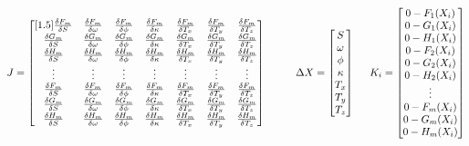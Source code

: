 \[
J = \begin{bmatrix}[1.5]
\ddx{F_m}{S} & \ddx{F_m}{\omega} & \ddx{F_m}{\phi} & \ddx{F_m}{\kappa} & \ddx{F_m}{T_x} & \ddx{F_m}{T_y} & \ddx{F_m}{T_z} \\
\ddx{G_m}{S} & \ddx{G_m}{\omega} & \ddx{G_m}{\phi} & \ddx{G_m}{\kappa} & \ddx{G_m}{T_x} & \ddx{G_m}{T_y} & \ddx{G_m}{T_z} \\
\ddx{H_m}{S} & \ddx{H_m}{\omega} & \ddx{H_m}{\phi} & \ddx{H_m}{\kappa} & \ddx{H_m}{T_x} & \ddx{H_m}{T_y} & \ddx{H_m}{T_z} \\
\vdots & \vdots & \vdots& \vdots  & \vdots & \vdots& \vdots \\
\ddx{F_m}{S} & \ddx{F_m}{\omega} & \ddx{F_m}{\phi} & \ddx{F_m}{\kappa} & \ddx{F_m}{T_x} & \ddx{F_m}{T_y} & \ddx{F_m}{T_z} \\
\ddx{G_m}{S} & \ddx{G_m}{\omega} & \ddx{G_m}{\phi} & \ddx{G_m}{\kappa} & \ddx{G_m}{T_x} & \ddx{G_m}{T_y} & \ddx{G_m}{T_z} \\
\ddx{H_m}{S} & \ddx{H_m}{\omega} & \ddx{H_m}{\phi} & \ddx{H_m}{\kappa} & \ddx{H_m}{T_x} & \ddx{H_m}{T_y} & \ddx{H_m}{T_z} \\
\end{bmatrix}
\hspace{1cm}
\Delta X = 
\begin{bmatrix}
S \\
\omega \\
\phi \\
\kappa \\
T_x \\
T_y \\
T_z
\end{bmatrix}
\hspace{0.5cm}
K_i = 
\begin{bmatrix}
0 - F_1(X_i) \\
0 - G_1(X_i) \\
0 - H_1(X_i) \\
0 - F_2(X_i) \\
0 - G_2(X_i) \\
0 - H_2(X_i) \\
 \vdots \\
0 - F_m(X_i) \\
0 - G_m(X_i) \\
0 - H_m(X_i)
\end{bmatrix}
\]
